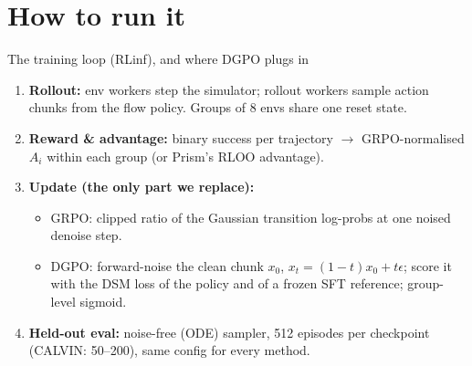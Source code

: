 \documentclass[aspectratio=169,11pt]{beamer}
\begin{document}
\section{How to run it}
\begin{frame}{The training loop (RLinf), and where DGPO plugs in}
  \small
  \begin{enumerate}
    \item \textbf{Rollout:} env workers step the simulator; rollout workers sample action chunks
          from the flow policy. Groups of 8 envs share one reset state.
    \item \textbf{Reward \& advantage:} binary success per trajectory $\to$ GRPO-normalised
          $A_i$ within each group (or Prism's RLOO advantage).
    \item \textbf{Update (the only part we replace):}
      \begin{itemize}
        \item GRPO: clipped ratio of the Gaussian transition log-probs at one noised denoise step.
        \item DGPO: forward-noise the clean chunk $x_0$, $x_t=(1-t)x_0+t\epsilon$; score it with the
              DSM loss of the policy and of a frozen SFT reference; group-level sigmoid.
      \end{itemize}
    \item \textbf{Held-out eval:} noise-free (ODE) sampler, 512 episodes per checkpoint
          (CALVIN: 50--200), same config for every method.
  \end{enumerate}
\end{frame}
\end{document}
